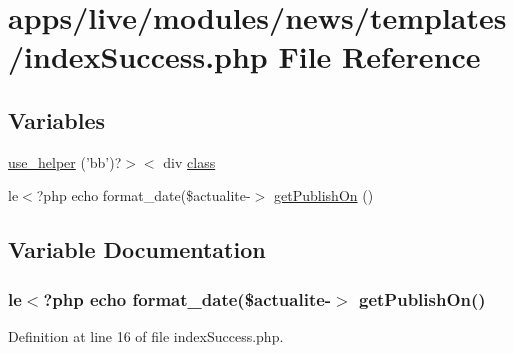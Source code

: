 \hypertarget{live_2modules_2news_2templates_2index_success_8php}{\section{apps/live/modules/news/templates/index\-Success.php File Reference}
\label{live_2modules_2news_2templates_2index_success_8php}
}
\subsection*{Variables}
\begin{DoxyCompactItemize}
\item 
\hyperlink{live_2modules_2news_2templates_2index_success_8php_ad20740d877696f45a78b0497ff807965}{use\-\_\-helper} ('bb')?$>$$<$ div \hyperlink{live_2modules_2news_2templates_2__actualitelight_8php_a185c73c6507391d1eb38c776b68ce96d}{class}
\item 
le$<$?php echo format\-\_\-date(\$actualite-\/$>$ \hyperlink{live_2modules_2news_2templates_2index_success_8php_a3c158fe87c824684f8b25431b03eb836}{get\-Publish\-On} ()
\end{DoxyCompactItemize}


\subsection{Variable Documentation}
\hypertarget{live_2modules_2news_2templates_2index_success_8php_a3c158fe87c824684f8b25431b03eb836}{
\subsubsection[{get\-Publish\-On}]{\setlength{\rightskip}{0pt plus 5cm}le$<$?php echo format\-\_\-date(\$actualite-\/$>$ get\-Publish\-On()}}\label{live_2modules_2news_2templates_2index_success_8php_a3c158fe87c824684f8b25431b03eb836}


Definition at line 16 of file index\-Success.\-php.

